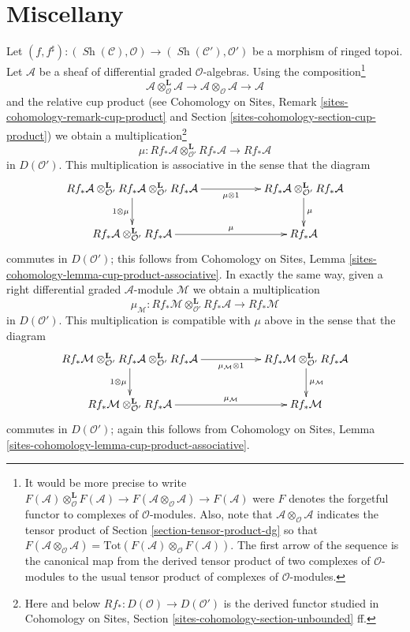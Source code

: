 \documentclass{stacks-project}
\theoremstyle{plain}
\theoremstyle{definition}
\theoremstyle{remark}
\numberwithin{equation}{subsection}
\def\Sh{\mathop{\mathit{Sh}}\nolimits}
\begin{document}
\section{Miscellany}
\label{section-misc}

\noindent
Let $(f, f^\sharp) : (\Sh(\mathcal{C}), \mathcal{O})
\to (\Sh(\mathcal{C}'), \mathcal{O}')$ be a morphism of
ringed topoi. Let $\mathcal{A}$ be a sheaf of differential graded
$\mathcal{O}$-algebras. Using the composition\footnote{It would be
more precise to write
$F(\mathcal{A}) \otimes_\mathcal{O}^\mathbf{L} F(\mathcal{A})
\to F(\mathcal{A} \otimes_\mathcal{O} \mathcal{A}) \to F(\mathcal{A})$
were $F$ denotes the forgetful functor to complexes of $\mathcal{O}$-modules.
Also, note that $\mathcal{A} \otimes_\mathcal{O} \mathcal{A}$ indicates
the tensor product of Section \ref{section-tensor-product-dg} so that
$F(\mathcal{A} \otimes_\mathcal{O} \mathcal{A}) =
\text{Tot}(F(\mathcal{A}) \otimes_\mathcal{O} F(\mathcal{A}))$.
The first arrow of the sequence is the canonical map from the derived tensor
product of two complexes of $\mathcal{O}$-modules to the usual tensor
product of complexes of $\mathcal{O}$-modules.}
$$
\mathcal{A} \otimes_\mathcal{O}^\mathbf{L} \mathcal{A}
\longrightarrow
\mathcal{A} \otimes_\mathcal{O} \mathcal{A}
\longrightarrow
\mathcal{A}
$$
and the relative cup product (see Cohomology on Sites, Remark
\ref{sites-cohomology-remark-cup-product} and
Section \ref{sites-cohomology-section-cup-product})
we obtain a multiplication\footnote{Here and below
$Rf_* : D(\mathcal{O}) \to D(\mathcal{O}')$ is the derived
functor studied in
Cohomology on Sites, Section \ref{sites-cohomology-section-unbounded} ff.}
$$
\mu :
Rf_*\mathcal{A} \otimes_{\mathcal{O}'}^\mathbf{L} Rf_*\mathcal{A}
\longrightarrow
Rf_*\mathcal{A}
$$
in $D(\mathcal{O}')$. This multiplication is associative in the sense
that the diagram
$$
\xymatrix{
Rf_*\mathcal{A} \otimes_{\mathcal{O}'}^\mathbf{L} Rf_*\mathcal{A}
\otimes_{\mathcal{O}'}^\mathbf{L} Rf_*\mathcal{A}
\ar[rr]_-{\mu \otimes 1} \ar[d]_{1 \otimes \mu} & &
Rf_*\mathcal{A} \otimes_{\mathcal{O}'}^\mathbf{L} Rf_*\mathcal{A}
\ar[d]^\mu \\
Rf_*\mathcal{A} \otimes_{\mathcal{O}'}^\mathbf{L} Rf_*\mathcal{A}
\ar[rr]^-\mu & &
Rf_*\mathcal{A}
}
$$
commutes in $D(\mathcal{O}')$; this follows from
Cohomology on Sites, Lemma \ref{sites-cohomology-lemma-cup-product-associative}.
In exactly the same way, given a
right differential graded $\mathcal{A}$-module $\mathcal{M}$
we obtain a multiplication
$$
\mu_\mathcal{M} :
Rf_*\mathcal{M} \otimes_{\mathcal{O}'}^\mathbf{L} Rf_*\mathcal{A}
\longrightarrow
Rf_*\mathcal{M}
$$
in $D(\mathcal{O}')$. This multiplication is compatible with $\mu$
above in the sense that the diagram
$$
\xymatrix{
Rf_*\mathcal{M} \otimes_{\mathcal{O}'}^\mathbf{L} Rf_*\mathcal{A}
\otimes_{\mathcal{O}'}^\mathbf{L} Rf_*\mathcal{A}
\ar[rr]_-{\mu_\mathcal{M} \otimes 1} \ar[d]_{1 \otimes \mu} & &
Rf_*\mathcal{M} \otimes_{\mathcal{O}'}^\mathbf{L} Rf_*\mathcal{A}
\ar[d]^{\mu_\mathcal{M}} \\
Rf_*\mathcal{M} \otimes_{\mathcal{O}'}^\mathbf{L} Rf_*\mathcal{A}
\ar[rr]^-{\mu_\mathcal{M}} & &
Rf_*\mathcal{M}
}
$$
commutes in $D(\mathcal{O}')$; again this follows from
Cohomology on Sites, Lemma \ref{sites-cohomology-lemma-cup-product-associative}.
\end{document}
